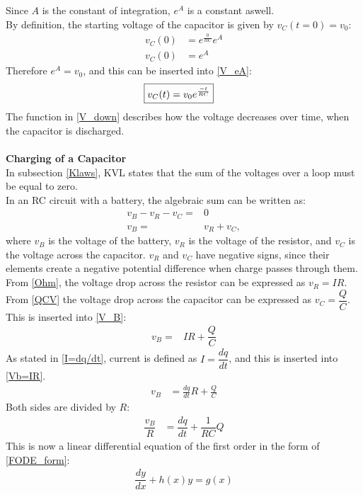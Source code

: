 Since $A$ is the constant of integration, $e^A$ is a constant aswell.
\\
By definition, the starting voltage of the capacitor is given by $v_C(t=0)=v_0$:
 \begin{align*}
	v_C(0) &= e^{\frac{0}{RC}}e^A\\
	v_C(0) &= e^A
 \end{align*}
Therefore $e^A = v_0$, and this can be inserted into \eqref{V_eA}:
\begin{align}
\label{V_down}
\Aboxed{
 v_C(t) = v_0e^{\frac{-t}{RC}}
 }
\end{align}
The function in \eqref{V_down} describes how the voltage decreases over time, when the capacitor is discharged.
\\
\\
\textbf{Charging of a Capacitor}\\
In subsection \ref{Klaws}, KVL states that the sum of the voltages over a loop must be equal to zero. 
\\
In an RC circuit with a battery, the algebraic sum can be written as:
\begin{align}
v_B-v_R-v_C =& 0 \nonumber \\
v_B=&v_R+v_C, \label{V_B}
\end{align}
where $v_B$ is the voltage of the battery, $v_R$ is the voltage of the resistor, and $v_C$ is the voltage across the capacitor. $v_R$ and $v_C$ have negative signs, since their elements create a negative potential difference when charge passes through them.
\\
From \eqref{Ohm}, the voltage drop across the resistor can be expressed as $v_R=IR$. From \eqref{QCV} the voltage drop across the capacitor can be expressed as $v_C=\dfrac{Q}{C}$. This is inserted into \eqref{V_B}:
\begin{align}
v_B =& IR+\dfrac{Q}{C} \label{Vb=IR}
\end{align}
As stated in \eqref{I=dq/dt}, current is defined as $I =\dfrac{dq}{dt}$, and this is inserted into \eqref{Vb=IR}.
 \begin{align*}
 	v_B &= \frac{dq}{dt} R + \frac{Q}{C}
 \end{align*}
Both sides are divided by $R$:
\begin{align}
\dfrac{v_B}{R} &= \dfrac{dq}{dt} + \dfrac{1}{RC}Q\label{Vb/R} 
\end{align}
This is now a linear differential equation of the first order in the form of \eqref{FODE_form}:
\begin{align*}
\dfrac{dy}{dx}+h(x)y=g(x)
\end{align*}
